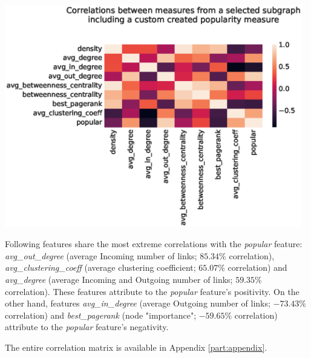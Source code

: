 \begin{center}
\includegraphics[width=13cm,keepaspectratio]{figures/graph-measures-correlation.eps}
\label{figure:graph-measures-correlation}
\end{center}

Following features share the most extreme correlations with the \textit{popular} feature: \textit{avg\_out\_degree} (average Incoming number of links; \(85.34\%\) correlation), \textit{avg\_clustering\_coeff} (average clustering coefficient; \(65.07\%\) correlation) and \textit{avg\_degree} (average Incoming and Outgoing number of links; \(59.35\%\) correlation). These features attribute to the \textit{popular} feature's positivity. On the other hand, features \textit{avg\_in\_degree} (average Outgoing number of links; \(-73.43\%\) correlation) and \textit{best\_pagerank} (node "importance"; \(-59.65\%\) correlation) attribute to the \textit{popular} feature's negativity.

The entire correlation matrix is available in Appendix \ref{part:appendix}.
